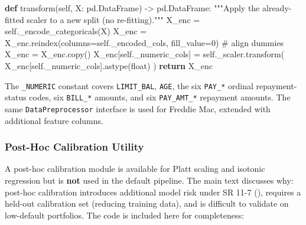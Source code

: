 \documentclass[
  letterpaper,
  DIV=11,
  numbers=noendperiod]{scrartcl}
\newenvironment{Shaded}{\begin{snugshade}}{\end{snugshade}}
\newcommand{\BuiltInTok}[1]{\textcolor[rgb]{0.00,0.23,0.31}{#1}}
\newcommand{\CommentTok}[1]{\textcolor[rgb]{0.37,0.37,0.37}{#1}}
\newcommand{\ControlFlowTok}[1]{\textcolor[rgb]{0.00,0.23,0.31}{\textbf{#1}}}
\newcommand{\DecValTok}[1]{\textcolor[rgb]{0.68,0.00,0.00}{#1}}
\newcommand{\KeywordTok}[1]{\textcolor[rgb]{0.00,0.23,0.31}{\textbf{#1}}}
\newcommand{\NormalTok}[1]{\textcolor[rgb]{0.00,0.23,0.31}{#1}}
\newcommand{\OperatorTok}[1]{\textcolor[rgb]{0.37,0.37,0.37}{#1}}
\newcommand{\VariableTok}[1]{\textcolor[rgb]{0.07,0.07,0.07}{#1}}
\begin{document}
\begin{Shaded}
\begin{Highlighting}[]
\KeywordTok{def}\NormalTok{ transform(}\VariableTok{self}\NormalTok{, X: pd.DataFrame) }\OperatorTok{{-}\textgreater{}}\NormalTok{ pd.DataFrame:}
    \CommentTok{"""Apply the already{-}fitted scaler to a new split (no re{-}fitting)."""}
\NormalTok{    X\_enc }\OperatorTok{=} \VariableTok{self}\NormalTok{.\_encode\_categoricals(X)}
\NormalTok{    X\_enc }\OperatorTok{=}\NormalTok{ X\_enc.reindex(columns}\OperatorTok{=}\VariableTok{self}\NormalTok{.\_encoded\_cols, fill\_value}\OperatorTok{=}\DecValTok{0}\NormalTok{)  }\CommentTok{\# align dummies}
\NormalTok{    X\_enc }\OperatorTok{=}\NormalTok{ X\_enc.copy()}
\NormalTok{    X\_enc[}\VariableTok{self}\NormalTok{.\_numeric\_cols] }\OperatorTok{=} \VariableTok{self}\NormalTok{.\_scaler.transform(}
\NormalTok{        X\_enc[}\VariableTok{self}\NormalTok{.\_numeric\_cols].astype(}\BuiltInTok{float}\NormalTok{)}
\NormalTok{    )}
    \ControlFlowTok{return}\NormalTok{ X\_enc}
\end{Highlighting}
\end{Shaded}

The \texttt{\_NUMERIC} constant covers \texttt{LIMIT\_BAL},
\texttt{AGE}, the six \texttt{PAY\_*} ordinal repayment-status codes,
six \texttt{BILL\_*} amounts, and six \texttt{PAY\_AMT\_*} repayment
amounts. The same \texttt{DataPreprocessor} interface is used for
Freddie Mac, extended with additional feature columns.

\subsubsection{Post-Hoc Calibration
Utility}\label{sec-credit-risk-calibration-snippet}

A post-hoc calibration module is available for Platt scaling and
isotonic regression but is \textbf{not} used in the default pipeline.
The main text discusses why: post-hoc calibration introduces additional
model risk under SR 11-7 (), requires a held-out
calibration set (reducing training data), and is difficult to validate
on low-default portfolios. The code is included here for completeness:
\end{document}
